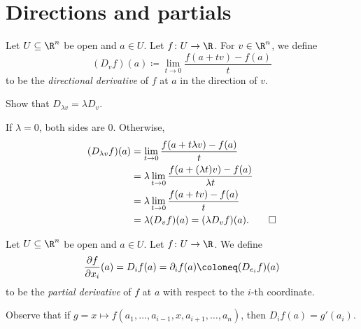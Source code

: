 \section{Directions and partials} \label{sec:pdv}

\begin{definition} \label{def:ddv}
    Let $U \subseteq \R^n$ be open and $a \in U$.
    Let $f\colon U \to \R$.
    For $v \in \R^n$, we define \[
        (D_v f)(a) \coloneq \lim_{t \to 0} \frac{f(a + tv) - f(a)}{t}
    \] to be the \emph{directional derivative} of $f$ at $a$
    in the direction of $v$.
\end{definition}

\begin{exercise}
    Show that $D_{\lambda v} = \lambda D_v$.
\end{exercise}
\begin{solution}
    If $\lambda = 0$, both sides are $0$.
    Otherwise, \begin{align*}
        (D_{\lambda v} f)(a)
            &= \lim_{t \to 0} \frac{f(a + t\lambda v) - f(a)}{t} \\
            &= \lambda \lim_{t \to 0} \frac{f(a + (\lambda t)v) - f(a)}
                                    {\lambda t} \\
            &= \lambda \lim_{t \to 0} \frac{f(a + tv) - f(a)}{t} \\
            &= \lambda (D_v f)(a) = (\lambda D_v f)(a). \qedhere
    \end{align*}
\end{solution}

\begin{definition*} \label{def:pdv}
    Let $U \subseteq \R^n$ be open and $a \in U$.
    Let $f\colon U \to \R$.
    We define \[
        \pdv{f}{x_i}(a) = D_i f(a) = \partial_i f(a) \coloneq (D_{e_i} f)(a)
    \] to be the \emph{partial derivative} of $f$ at $a$
    with respect to the $i$-th coordinate.
\end{definition*}
Observe that if $g = x \mapsto f(a_1,\dots,a_{i-1},x,a_{i+1},\dots,a_n)$,
then $D_i f(a) = g'(a_i).$
